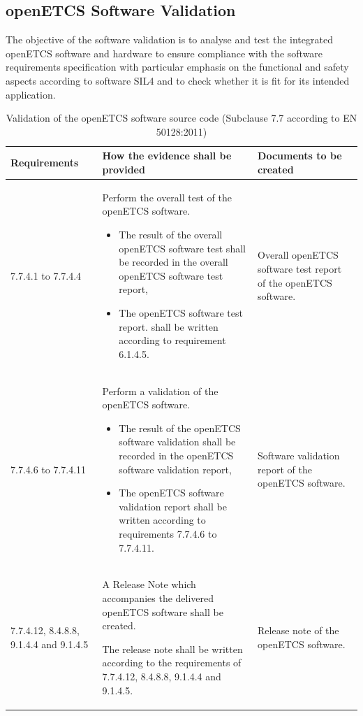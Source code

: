 \documentclass{template/openetcs_report}
\begin{document}
\subsection{openETCS Software Validation}
\label{ValSW}
\begin{flushleft}
The objective of the software validation is to analyse and test the integrated openETCS software and hardware to ensure compliance with the software requirements specification with particular emphasis on the functional and safety aspects according to software SIL4 and to check whether it is fit for its intended application.
\end{flushleft}
{\footnotesize\sffamily\centering
\begin{longtable}{|p{2cm}|p{9cm}|p{3cm}|}
\caption{Validation of the openETCS software source code  (Subclause 7.7 according to EN 50128:2011)}\\
\hline
\bfseries Requirements & \bfseries How the evidence shall be provided & \bfseries Documents to be created\\
\hline
\hline
\endhead
\hline
\endfoot

7.7.4.1 to 7.7.4.4 & Perform the overall test of the openETCS software.
\begin{itemize}\itemsep=0pt
  \item The result of the overall openETCS software test shall be recorded in the overall openETCS software test report, 
  \item The openETCS software test report. shall be written according to requirement 6.1.4.5.
\end{itemize}
& Overall openETCS software test report of the openETCS software.\\ 
\hline
7.7.4.6 to 7.7.4.11 & Perform a validation of the openETCS software.
\begin{itemize}\itemsep=0pt
  \item The result of the openETCS software validation shall be recorded in the openETCS software validation report, 
  \item The openETCS software validation report shall be written according to requirements 7.7.4.6 to 7.7.4.11.
\end{itemize}
& Software validation report of the openETCS software.\\ 
\hline
7.7.4.12, 8.4.8.8, 9.1.4.4 and 9.1.4.5 & A Release Note which accompanies the delivered openETCS software shall be created.

The release note shall be written according to the requirements of 7.7.4.12, 8.4.8.8, 9.1.4.4 and 9.1.4.5.
& Release note of the openETCS software.\\ 
\hline
\end{longtable}}
\end{document}
